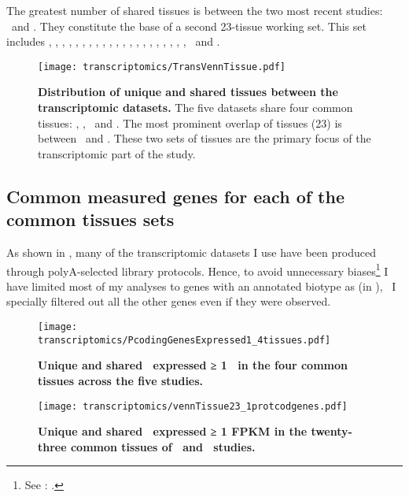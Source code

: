 The greatest number of shared tissues is
between the two most recent studies:
\uhlen\ and \gtex.
They constitute the base of a second 23-tissue working set.
This set includes
\Adipose, \Adrenal, \Bladder, \Cortex, \hcolon, \Esophagus,
\Fallopian, \heart, \kidney, \liver, \lung, \Ovary, \Pancreas, \Prostate,
\salivary, \skeletal, \skin, \intestine, \spleen, \stomach, \testis,
\thyroid\ and \uterus.

\begin{figure}[!htbp]
\texttt{[image: transcriptomics/TransVennTissue.pdf]}\centering
\caption[Distribution of unique and shared tissues between the
transcriptomic datasets]
{\label{fig:VennStudiesT}\textbf{Distribution of unique and shared tissues
between the transcriptomic datasets.} The five datasets share four
common tissues: \heart, \kidney, \liver\ and \testis.
The most prominent overlap of tissues (23) is between \uhlen\ and \gtex.
These two sets of tissues are the primary focus of the transcriptomic part of the
study.}
\end{figure}

\subsection{Common measured genes for each of the common tissues sets\quad}%
\label{subsec:transGeneOverlap}
\vspace*{-7mm}
As shown in ,
many of the transcriptomic datasets I use have been produced through
polyA-selected library protocols.
Hence,
to avoid unnecessary biases\footnote{See
: .}
I have limited most of my analyses to genes with an annotated biotype as
\emph{\pc} (in ),
\ie\ I specially filtered out all the other genes even if they were observed.

\begin{figure}[!hptb]
    \texttt{[image: transcriptomics/PcodingGenesExpressed1\_4tissues.pdf]}\centering
    \caption[Unique and shared \pcgs\ expressed
    in the 4 common tissues (≥1 \FPKM)]{\label{fig:ExpGenePcoding1}\textbf{Unique
    and shared \pcgs\ expressed ≥ 1 \FPKM\ in the four common tissues
    across the five studies.}}
\end{figure}

\begin{figure}[!hptb]
    \texttt{[image: transcriptomics/vennTissue23\_1protcodgenes.pdf]}\centering
    \caption[Unique and shared \pcgs\ expressed
    in the 23 common tissues (≥1 \FPKM)]%
    {\label{fig:ExpGenePcoding1_t23}\textbf{Unique
    and shared \pcgs\ expressed ≥ 1 FPKM in the twenty-three common tissues
    of \uhlen\ and \gtex\ studies.}}
\end{figure}

